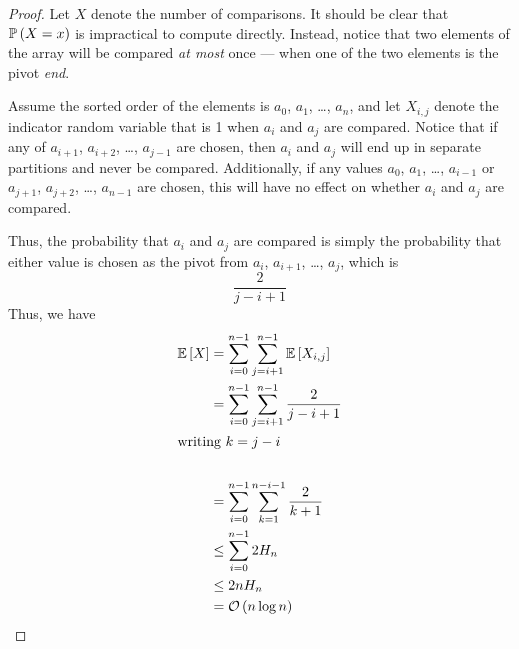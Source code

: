 \begin{proof}
    Let $X$ denote the number of comparisons. It should be clear that
    $\operatorname{\mathbb{P}}\left(X=x\right)$ is impractical to compute directly. Instead, notice that two
    elements of the array will be compared \emph{at most} once --- when one of
    the two elements is the pivot \emph{end}. 

    Assume the sorted order of the elements is $a_0$, $a_1$, \dots, $a_n$, and
    let $X_{i,j}$ denote the indicator random variable that is 1 when $a_i$ and
    $a_j$ are compared. Notice that if any of $a_{i+1}$, $a_{i + 2}$, \dots,
    $a_{j - 1}$ are chosen, then $a_i$ and $a_j$ will end up in separate
    partitions and never be compared. Additionally, if any values $a_0$, $a_1$,
    \dots, $a_{i - 1}$ or $a_{j + 1}$, $a_{j + 2}$, \dots, $a_{n-1}$ are chosen,
    this will have no effect on whether $a_i$ and $a_j$ are compared.
    
    Thus, the probability that $a_i$ and $a_j$ are compared is simply the
    probability that either value is chosen as the pivot from $a_i$, $a_{i +
    1}$, \dots, $a_j$, which is
    \[\frac{2}{j - i + 1}\]
    Thus, we have
    \begin{align*}\operatorname{\mathbb{E}}\left[X\right]
        &=\sum_{i=0}^{n-1}\sum_{j=i+1}^{n-1}\operatorname{\mathbb{E}}\left[X_{i,j}\right]\\
        &=\sum_{i=0}^{n-1}\sum_{j=i+1}^{n-1}\frac{2}{j - i + 1}\\
        \shortintertext{writing $k = j - i$}\\
        &=\sum_{i=0}^{n-1}\sum_{k=1}^{n - i - 1}\frac{2}{k + 1}\\
        &\leq\sum_{i=0}^{n-1}2H_n\\
        &\leq 2nH_n\\
        &=\mathcal{O}\left(n\log{n}\right)\qedhere
    \end{align*}
\end{proof}